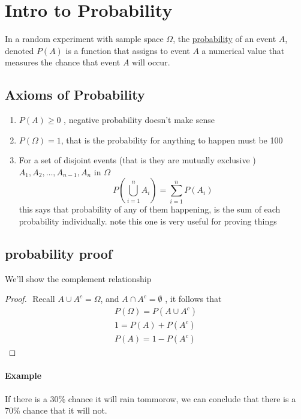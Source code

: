 \documentclass[11pt]{book}
\begin{document}

\section{Intro to Probability}%
\label{sec:intro_to_probability}

\begin{defn}[Probability]\label{defn:probability}
In a random experiment with sample space $\Omega $,  the \underline{probability} of an event $A$, denoted $P\left(A\right) $ is a function that assigns to event $A$ a numerical value that measures the chance that event $A$ will occur.      
\end{defn}

\subsection{Axioms of Probability}%
\label{sub:axioms_of_probability}

\begin{enumerate}
    \item $P\left(A\right) \ge 0$ , negative probability doesn't make sense
    \item $P\left(\Omega \right) = 1$,  that is the probability for anything to happen must be 100%
    \item For a set of disjoint events (that is they are mutually exclusive ) $A_{1} , A_{2} , \dotsc  , A_{n - 1} , A_{n} $ in $\Omega $ 
        \[
        P\left(\bigcup_{i=1}^{n} A_{i} \right) = \sum_{i=1}^{n} P\left(A_{i} \right)  
        \]
        this says that probability of any of them happening, is the sum of each probability individually. note this one is very useful for proving things
\end{enumerate}


\subsection{probability proof}%
\label{sub:probability_proof}

We'll show the complement relationship
\begin{proof}
    $ $\newline
    Recall $A\cup A^{c} = \Omega $, and $A\cap A^{c} = \emptyset $ , it follows that 
    \begin{gather*}
        P\left(\Omega \right) = P\left(A\cup A^{c} \right) \\
        1= P\left(A\right)  + P\left(A^{c} \right) \\
        P\left(A\right) = 1 - P\left(A^{c} \right) 
    \end{gather*}
\end{proof}

\paragraph{Example} 
If there is a 30\% chance it will rain tommorow, we can conclude that there is a 70\% chance that it will not.



\end{document}
